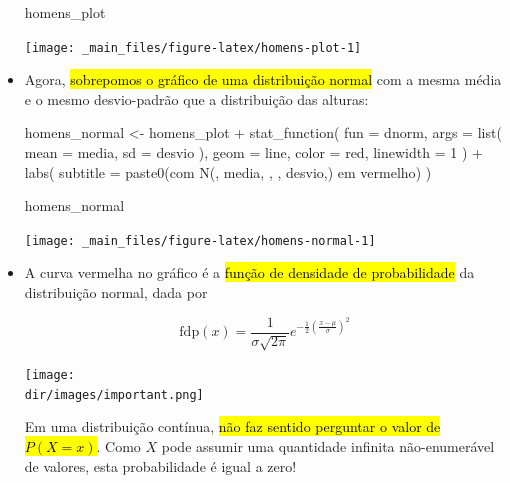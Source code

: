 \documentclass[
  11pt]{report}
\newenvironment{Shaded}{\begin{snugshade}}{\end{snugshade}}
\newcommand{\AttributeTok}[1]{\textcolor[rgb]{0.77,0.63,0.00}{#1}}
\newcommand{\DecValTok}[1]{\textcolor[rgb]{0.00,0.00,0.81}{#1}}
\newcommand{\FunctionTok}[1]{\textcolor[rgb]{0.00,0.00,0.00}{#1}}
\newcommand{\NormalTok}[1]{#1}
\newcommand{\OtherTok}[1]{\textcolor[rgb]{0.56,0.35,0.01}{#1}}
\newcommand{\SpecialCharTok}[1]{\textcolor[rgb]{0.00,0.00,0.00}{#1}}
\newcommand{\StringTok}[1]{\textcolor[rgb]{0.31,0.60,0.02}{#1}}
\newcommand{\dir}{/ssd/R/x86_64-pc-linux-gnu-library/4.3/fnaufelRmd/rmarkdown/resources}
\newenvironment{rmdimportant}
{
  \begin{myimportant}
    \texttt{[image: \\dir/images/important.png]}
    \tcblower
  }
  {
  \end{myimportant}
}
\renewenvironment{Shaded}{
    \begin{mdframed}[%
      roundcorner=2pt,%
      innerleftmargin=5pt,%
      innerrightmargin=5pt,%
      topline=true,%
      leftline=true,%
      rightline=true,%
      bottomline=true,%
      linewidth=0.5pt,%
      linecolor=black!20,%
      backgroundcolor=black!2,%
      skipabove=2ex,%
      skipbelow=2.5ex%
    ]%
  }
  {
    \end{mdframed}
  }
\begin{document}
\begin{itemize}
\begin{Shaded}
\begin{Highlighting}[]
\NormalTok{homens\_plot}
\end{Highlighting}
\end{Shaded}

  \begin{center}\texttt{[image: \_main\_files/figure-latex/homens-plot-1]} \end{center}
\item
  Agora, {\hl{sobrepomos o gráfico de uma distribuição normal}} com a mesma média e o mesmo desvio-padrão que a distribuição das alturas:

\begin{Shaded}
\begin{Highlighting}[]
\NormalTok{homens\_normal }\OtherTok{\textless{}{-}}\NormalTok{ homens\_plot }\SpecialCharTok{+}
  \FunctionTok{stat\_function}\NormalTok{(}
    \AttributeTok{fun =}\NormalTok{ dnorm, }
    \AttributeTok{args =} \FunctionTok{list}\NormalTok{(}
      \StringTok{\textquotesingle{}mean\textquotesingle{}} \OtherTok{=}\NormalTok{ media,}
      \StringTok{\textquotesingle{}sd\textquotesingle{}} \OtherTok{=}\NormalTok{ desvio}
\NormalTok{    ),}
    \AttributeTok{geom =} \StringTok{\textquotesingle{}line\textquotesingle{}}\NormalTok{,}
    \AttributeTok{color =} \StringTok{\textquotesingle{}red\textquotesingle{}}\NormalTok{,}
    \AttributeTok{linewidth =} \DecValTok{1}
\NormalTok{  ) }\SpecialCharTok{+}
  \FunctionTok{labs}\NormalTok{(}
    \AttributeTok{subtitle =} \FunctionTok{paste0}\NormalTok{(}\StringTok{\textquotesingle{}com N(\textquotesingle{}}\NormalTok{, media, }\StringTok{\textquotesingle{}, \textquotesingle{}}\NormalTok{, desvio,}\StringTok{\textquotesingle{}) em vermelho\textquotesingle{}}\NormalTok{)}
\NormalTok{  )}

\NormalTok{homens\_normal}
\end{Highlighting}
\end{Shaded}

  \begin{center}\texttt{[image: \_main\_files/figure-latex/homens-normal-1]} \end{center}
\item
  A curva vermelha no gráfico é a {\hl{função de densidade de probabilidade}} da distribuição normal, dada por

  \[
  \text{fdp}(x) = {\frac {1}{\sigma {\sqrt {2\pi }}}}e^{-{\frac {1}{2}}\left({\frac {x-\mu }{\sigma }}\right)^{2}}
  \]

  \begin{rmdimportant}
  Em uma distribuição contínua, {\hl{não faz sentido perguntar o valor de $P(X = x)$}}. Como $X$ pode assumir uma quantidade infinita não-enumerável de valores, esta probabilidade é igual a zero!


\end{rmdimportant}
\end{itemize}
\end{document}
